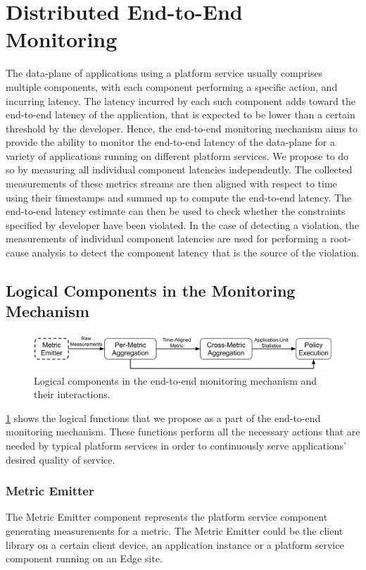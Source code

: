 \section{Distributed End-to-End Monitoring}
\label{sec:e2e_mon_dse}
The data-plane of applications using a platform service usually comprises multiple components, with each component performing a specific action, and incurring latency. The latency incurred by each such component adds toward the end-to-end latency of the application, that is expected to be lower than a certain threshold by the developer. Hence, the end-to-end monitoring mechanism aims to provide the ability to monitor the end-to-end latency of the data-plane for a variety of applications running on different platform services. We propose to do so by measuring all individual component latencies independently. The collected measurements of these metrics streams are then aligned with respect to time using their timestamps and summed up to compute the end-to-end latency. The end-to-end latency estimate can then be used to check whether the constraints specified by developer have been violated. In the case of detecting a violation, the measurements of individual component latencies are used for performing a root-cause analysis to detect the component latency that is the source of the violation.

\subsection{Logical Components in the Monitoring Mechanism}
\label{sec:monitoring_functions}
\begin{figure}
\centering
\includegraphics[width=\linewidth]{figures/design_space/monitoring/functions.pdf}
\caption{Logical components in the end-to-end monitoring mechanism and their interactions.}
\label{fig:monitoring_functions}
\end{figure}
\cref{fig:monitoring_functions} shows the logical functions that we propose as a part of the end-to-end monitoring mechanism. These functions perform all the necessary actions that are needed by typical platform services in order to continuously serve applications' desired quality of service.
\subsubsection{Metric  Emitter}
The Metric  Emitter component represents the platform service component generating measurements for a metric. The Metric  Emitter could be the client library on a certain client device, an application instance or a platform service component running on an Edge site. 
